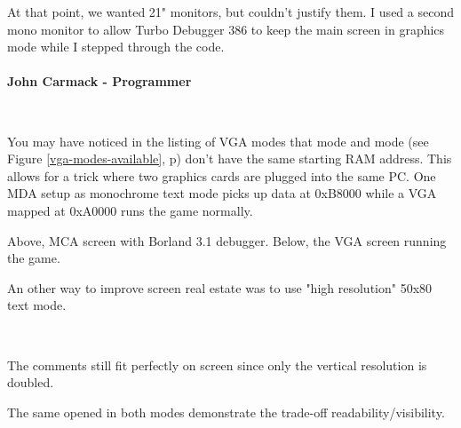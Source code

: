 \documentclass[book.tex]{subfiles}
\begin{document}
\begin{fancyquotes}
At that point, we wanted 21" monitors, but couldn't justify them.  I used a second mono monitor to allow Turbo Debugger 386 to keep the main screen in graphics mode while I stepped through the code.\\
 \\
\textbf{John Carmack - Programmer}
\end{fancyquotes}\\
\par
\vspace{-5pt}
You may have noticed in the listing of VGA modes that mode  and mode  (see Figure \ref{vga-modes-available}, p\pageref{vga-modes-available})  don't have the same starting RAM address. This allows for a trick where two graphics cards are plugged into the same PC. One MDA setup as monochrome text mode picks up data at 0xB8000 while a VGA mapped at 0xA0000 runs the game normally.
      \\
      \par
Above, MCA screen with Borland 3.1 debugger. Below, the VGA screen running the game.\\

\pagebreak
\par

An other way to improve screen real estate was to use "high resolution" 50x80 text mode.\\
\par 
 \\
 \par
 \vspace{-7pt}
The comments still fit perfectly on screen since only the vertical resolution is doubled.\\
\par
\vspace{-4pt}
 The same  opened in both modes demonstrate the trade-off readability/visibility.\\
\par
\end{document}
